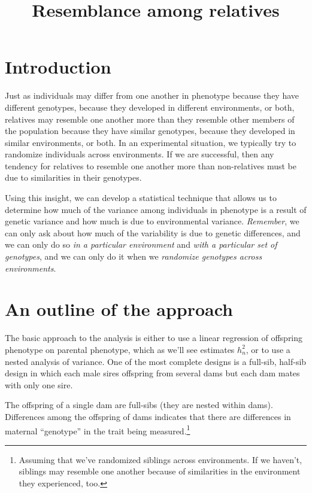 \documentclass[12pt]{article}
\title{Resemblance among relatives}
\begin{document}
\maketitle

\thispagestyle{first}

\section*{Introduction}

Just as individuals may differ from one another in phenotype because
they have different genotypes, because they developed in different
environments, or both, relatives may resemble one another more than
they resemble other members of the population because they have
similar genotypes, because they developed in similar environments, or
both. In an experimental situation, we typically try to randomize
individuals across environments. If we are successful, then any
tendency for relatives to resemble one another more than non-relatives
must be due to similarities in their genotypes.

Using this insight, we can develop a statistical technique that allows
us to determine how much of the variance among individuals in
phenotype is a result of genetic variance and how much is due to
environmental variance. {\it Remember}, we can only ask about how much
of the variability is due to genetic differences, and we can only do
so {\it in a particular environment\/} and {\it with a particular set
of genotypes}, and we can only do it when we {\it randomize genotypes
  across environments}.

\section*{An outline of the approach}

The basic approach to the analysis is either to use a linear
regression of offspring phenotype on parental phenotype, which as
we'll see estimates $h^2_n$, or to use a nested analysis of
variance. One of the most complete designs is a full-sib, half-sib
design in which each male sires offspring from several dams but each
dam mates with only one sire.

The offspring of a single dam are full-sibs (they are nested within
dams). Differences among the offspring of dams indicates that there
are differences in maternal ``genotype'' in the trait being
measured.\footnote{Assuming that we've randomized siblings across
  environments. If we haven't, siblings may resemble one another
  because of similarities in the environment they experienced, too.}
\end{document}
